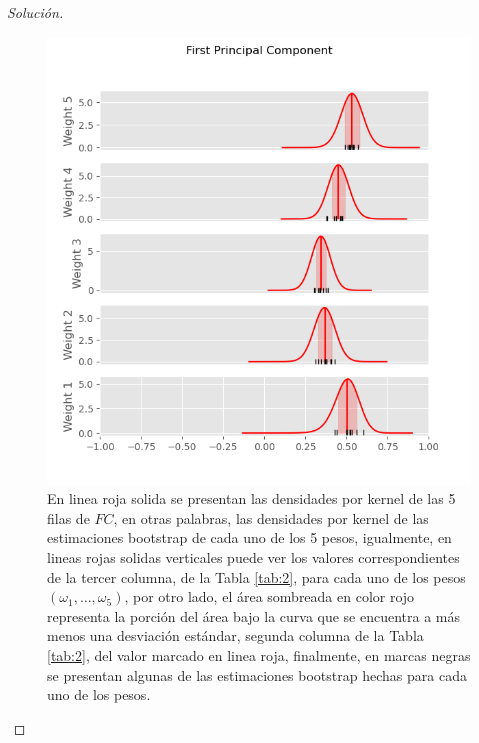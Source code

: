 \documentclass[10.5pt,notitlepage]{article}
\newenvironment{solucion}
  {\begin{proof}[Solución]}
  {\end{proof}}
\theoremstyle{plain}
\begin{document}
\begin{solucion}
\begin{figure}[htb]
    \includegraphics[scale = 0.5]{Figure_9.png}
    \caption{En linea roja solida se presentan las densidades por kernel de las 5 filas de \(FC\), en otras palabras, las densidades por kernel de las estimaciones bootstrap de cada uno de los 5 pesos, igualmente, en lineas rojas solidas verticales puede ver los valores correspondientes de la tercer columna, de la Tabla \ref{tab:2}, para cada uno de los pesos \((\omega_1, \hdots, \omega_5)\), por otro lado, el área sombreada en color rojo representa la porción del área bajo la curva que se encuentra a más menos una desviación estándar, segunda columna de la Tabla \ref{tab:2}, del valor marcado en linea roja, finalmente, en marcas negras se presentan algunas de las estimaciones bootstrap hechas para cada uno de los pesos.}
    \label{fig:1}
\end{figure}

\end{solucion}
\end{document}
